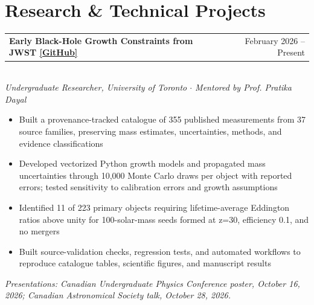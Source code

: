 \documentclass[letterpaper,10pt]{article}
\makeatletter
\newcommand{\heading}[2]{\begin{tabular*}{\textwidth}{l@{\extracolsep{\fill}}r}\textbf{#1} & #2\end{tabular*}}
\makeatother
\begin{document}
\section{Research \& Technical Projects}
\vspace{3pt}\heading{Early Black-Hole Growth Constraints from JWST \href{https://github.com/nniickels/highz-accretion-atlas}{\textnormal{\underline{[GitHub]}}}}{February 2026 -- Present}\\[-1pt]
{\small\textit{Undergraduate Researcher, University of Toronto $\cdot$ Mentored by Prof. Pratika Dayal}}
\begin{itemize}\small
\item Built a provenance-tracked catalogue of 355 published measurements from 37 source families, preserving mass estimates, uncertainties, methods, and evidence classifications
\item Developed vectorized Python growth models and propagated mass uncertainties through 10,000 Monte Carlo draws per object with reported errors; tested sensitivity to calibration errors and growth assumptions
\item Identified 11 of 223 primary objects requiring lifetime-average Eddington ratios above unity for 100-solar-mass seeds formed at z=30, efficiency 0.1, and no mergers
\item Built source-validation checks, regression tests, and automated workflows to reproduce catalogue tables, scientific figures, and manuscript results
\end{itemize}
{\small\textit{Presentations: Canadian Undergraduate Physics Conference poster, October 16, 2026; Canadian Astronomical Society talk, October 28, 2026.}}
\end{document}
